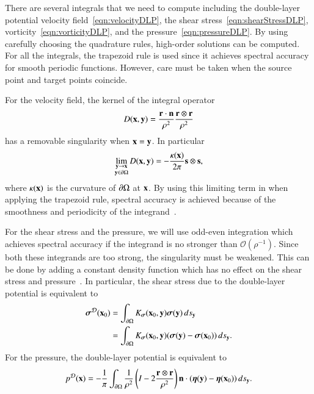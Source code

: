 \documentclass[preprint, 10pt]{elsarticle}
\begin{document}
\label{sec:quadrature}
There are several integrals that we need to compute including the
double-layer potential velocity field~\eqref{eqn:velocityDLP}, the shear
stress~\eqref{eqn:shearStressDLP}, vorticity~\eqref{eqn:vorticityDLP},
and the pressure~\eqref{eqn:pressureDLP}.  By using carefully choosing
the quadrature rules, high-order solutions can be computed.  For all the
integrals, the trapezoid rule is used since it achieves spectral
accuracy for smooth periodic functions.  However, care must be taken
when the source point and target points coincide.

For the velocity field, the kernel of the integral operator
\begin{align*}
  D({\mathbf{x}},{\mathbf{y}}) = \frac{{\mathbf{r}} \cdot {\mathbf{n}}}{\rho^2} 
               \frac{{\mathbf{r}} \otimes {\mathbf{r}}}{\rho^2}
\end{align*}
has a removable singularity when ${\mathbf{x}} = {\mathbf{y}}$.  In particular
\begin{align*}
  \lim_{\substack{{\mathbf{y}} \rightarrow {\mathbf{x}} \\ {\mathbf{y}} \in {\partial}\Omega}} D({\mathbf{x}},{\mathbf{y}}) = 
  -\frac{\kappa({\mathbf{x}})}{2\pi}{\mathbf{s}} \otimes {\mathbf{s}},
\end{align*}
where $\kappa({\mathbf{x}})$ is the curvature of ${\partial}\Omega$ at ${\mathbf{x}}$.  By using
this limiting term in when applying the trapezoid rule, spectral
accuracy is achieved because of the smoothness and periodicity of the
integrand~\cite{tre-wei2014}.

For the shear stress and the pressure, we will use odd-even integration
which achieves spectral accuracy if the integrand is no stronger than
$\mathcal{O}(\rho^{-1})$.  Since both these integrands are too strong,
the singularity must be weakened.  This can be done by adding a constant
density function which has no effect on the shear stress and
pressure~\cite{poz1992}.  In particular, the shear stress due to the
double-layer potential is equivalent to
\begin{align*}
  {\boldsymbol\sigma}^{{\mathcal{D}}}({\mathbf{x}}_0) &= \int_{{\partial}\Omega}K_{\boldsymbol\sigma}({\mathbf{x}}_0,{\mathbf{y}})
      {\boldsymbol\sigma}({\mathbf{y}}) \, ds_{{\mathbf{y}}} \\ 
      &= \int_{{\partial}\Omega}K_{\boldsymbol\sigma}({\mathbf{x}}_0,{\mathbf{y}})
      ({\boldsymbol\sigma}({\mathbf{y}}) - {\boldsymbol\sigma}({\mathbf{x}}_0)) \, ds_{{\mathbf{y}}}.
\end{align*}
For the pressure, the double-layer potential is equivalent to
\begin{align*}
  p^{\mathcal{D}}({\mathbf{x}}) = -\frac{1}{\pi}\int_{{\partial}\Omega} \frac{1}{\rho^2}
    \left(I - 2 \frac{{\mathbf{r}} \otimes {\mathbf{r}}}{\rho^2}\right) 
    {\mathbf{n}} \cdot ({\boldsymbol\eta}({\mathbf{y}}) - {\boldsymbol\eta}({\mathbf{x}}_0)) \,ds_{\mathbf{y}}.
\end{align*}
\end{document}
